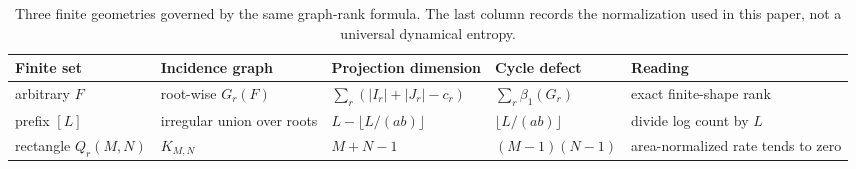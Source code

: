 \begin{table}[ht]
\centering
\caption{Three finite geometries governed by the same graph-rank formula.
The last column records the normalization used in this paper, not a universal
dynamical entropy.}\label{tab:geometries}
\small
\begin{tabularx}{\textwidth}{@{}>{\raggedright\arraybackslash}p{}
>{\raggedright\arraybackslash}p{}
>{\raggedright\arraybackslash}p{}
>{\raggedright\arraybackslash}p{}Y@{}}
\toprule
Finite set & Incidence graph & Projection dimension & Cycle defect & Reading\\
\midrule
arbitrary $F$ & root-wise $G_r(F)$ & $\sum_r(|I_r|+|J_r|-c_r)$ & $\sum_r\beta_1(G_r)$ & exact finite-shape rank\\
prefix $[L]$ & irregular union over roots & $L-\lfloor L/(ab)\rfloor$ & $\lfloor L/(ab)\rfloor$ & divide log count by $L$\\
rectangle $Q_r(M,N)$ & $K_{M,N}$ & $M+N-1$ & $(M-1)(N-1)$ & area-normalized rate tends to zero\\
\bottomrule
\end{tabularx}
\end{table}
